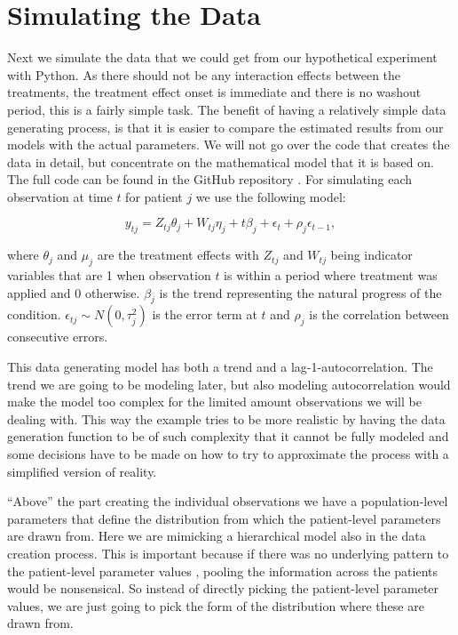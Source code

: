 \documentclass[12pt,a4paper,leqno]{report}
\theoremstyle{plain}
\theoremstyle{definition}
\theoremstyle{remark}
\begin{document}
\section{Simulating the Data}

Next we simulate the data that we could get from our hypothetical experiment with Python.
As there should not be any interaction effects between the treatments, the treatment
effect onset is immediate and there is no washout period, this is a fairly simple
task. The benefit of having a relatively simple data generating process, is that it is
easier to compare the estimated results from our models with the actual parameters. We will not go
over the code that creates the data in detail, but concentrate on
the mathematical model that it is based on. The full code can be found in the GitHub repository
\cite{github}. For simulating each observation at time \(t\) for patient \(j\) we use the following model:

\begin{def}\label{simulationmodel}
    \begin{equation}\label{}
        y_{tj} = Z_{tj}\theta_{j} + W_{tj}\eta_{j} + t\beta_j + \epsilon_t + \rho_j\epsilon_{t-1},
    \end{equation}
\end{def}where \(\theta_j\) and \(\mu_j\) are the treatment effects with \(Z_{tj}\) and \(W_{tj}\) being indicator
variables that are 1 when observation \(t\) is within a period where treatment was applied and
0 otherwise. \(\beta_j\) is the trend representing the natural progress of the
condition. \(\epsilon_{tj} \sim N(0,\tau_j^2) \) is the error term at \(t\) and
\(\rho_j\) is the correlation between consecutive errors.

This data generating model has both a trend and a lag-1-autocorrelation. The trend we
are going to be modeling later, but also modeling autocorrelation would make the model
too complex for the limited amount observations we will be dealing with. This way the example tries to be more realistic
by having the data generation function to be of such complexity that it cannot be
fully modeled and some decisions have to be made on how to try to approximate
the process with a simplified version of reality.

``Above'' the part creating the individual observations we have a population-level parameters
that define the distribution from which the patient-level parameters are drawn from.
Here we are mimicking a hierarchical model also in the data creation process. This is
important because if there was no underlying pattern to the patient-level parameter values
, pooling the information across the patients
would be nonsensical. So instead of directly picking the patient-level parameter values,
we are just going to pick the form of the distribution where these are drawn from.
\end{document}
